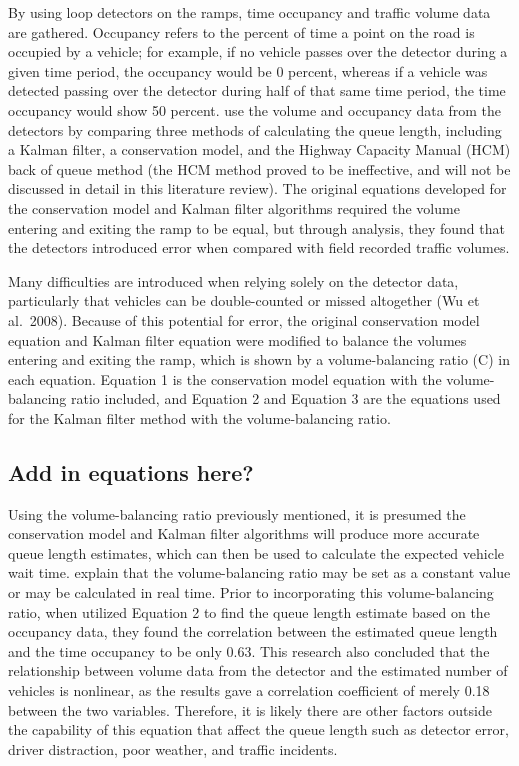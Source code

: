 \documentclass[numbered]{trbarticle}
\begin{document}
By using loop detectors on the ramps, time occupancy and traffic volume data are gathered. Occupancy refers to the percent of time a point on the road is occupied by a vehicle; for example, if no vehicle passes over the detector during a given time period, the occupancy would be 0 percent, whereas if a vehicle was detected passing over the detector during half of that same time period, the time occupancy would show 50 percent. \citet{wu2009experiment} use the volume and occupancy data from the detectors by comparing three methods of calculating the queue length, including a Kalman filter, a conservation model, and the Highway Capacity Manual (HCM) back of queue method (the HCM method proved to be ineffective, and will not be discussed in detail in this literature review). The original equations developed for the conservation model and Kalman filter algorithms required the volume entering and exiting the ramp to be equal, but through analysis, they found that the detectors introduced error when compared with field recorded traffic volumes.

Many difficulties are introduced when relying solely on the detector data, particularly that vehicles can be double-counted or missed altogether (Wu et al.~2008). Because of this potential for error, the original conservation model equation and Kalman filter equation were modified to balance the volumes entering and exiting the ramp, which is shown by a volume-balancing ratio (C) in each equation. Equation 1 is the conservation model equation with the volume-balancing ratio included, and Equation 2 and Equation 3 are the equations used for the Kalman filter method with the volume-balancing ratio.

\hypertarget{add-in-equations-here}{%
\subsection{Add in equations here?}\label{add-in-equations-here}}

Using the volume-balancing ratio previously mentioned, it is presumed the conservation model and Kalman filter algorithms will produce more accurate queue length estimates, which can then be used to calculate the expected vehicle wait time. \citet{wu2009experiment} explain that the volume-balancing ratio may be set as a constant value or may be calculated in real time. Prior to incorporating this volume-balancing ratio, when \citet{wu2009experiment} utilized Equation 2 to find the queue length estimate based on the occupancy data, they found the correlation between the estimated queue length and the time occupancy to be only 0.63. This research also concluded that the relationship between volume data from the detector and the estimated number of vehicles is nonlinear, as the results gave a correlation coefficient of merely 0.18 between the two variables. Therefore, it is likely there are other factors outside the capability of this equation that affect the queue length such as detector error, driver distraction, poor weather, and traffic incidents.
\end{document}
